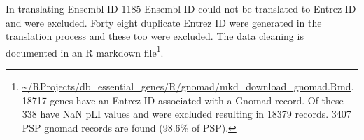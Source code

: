    In translating Ensembl ID 1185 Ensembl ID could not be translated to Entrez ID and were excluded. Forty eight duplicate Entrez ID were generated in the translation process and these too were excluded. The data cleaning is documented in an R markdown file\footnote{\url{~/RProjects/db_essential_genes/R/gnomad/mkd_download_gnomad.Rmd}. 18717 genes have an Entrez ID associated with a Gnomad record. Of these 338 have NaN pLI values and were excluded resulting in 18379 records. 3407 PSP gnomad records are found (98.6\% of PSP).
}.  %


















